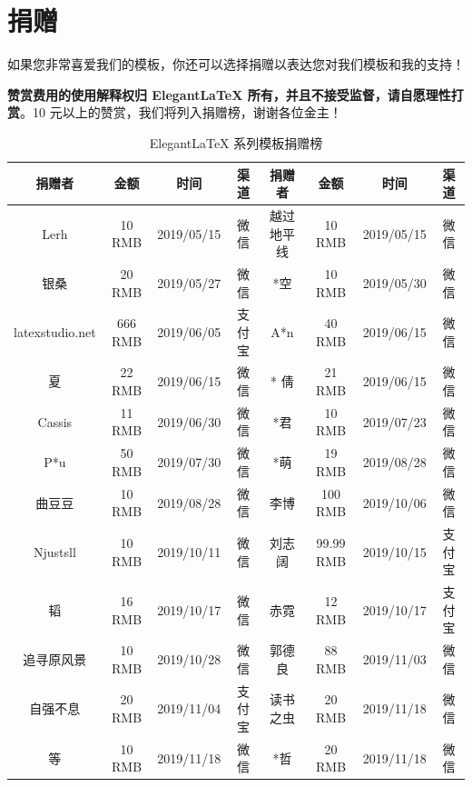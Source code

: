 \documentclass[lang=cn,11pt,a4paper,cite=authoryear]{elegantpaper}
\begin{document}
\section{捐赠}
如果您非常喜爱我们的模板，你还可以选择捐赠以表达您对我们模板和我的支持！

\begin{figure}[htbp]
  \centering

\end{figure}

\textbf{赞赏费用的使用解释权归 Elegant\LaTeX{} 所有，并且不接受监督，请自愿理性打赏}。10 元以上的赞赏，我们将列入捐赠榜，谢谢各位金主！


\begin{table}[!htb]
  \centering
  \caption{Elegant\LaTeX{} 系列模板捐赠榜}
    \begin{tabular}{*{4}{>{\scriptsize}c}|*{4}{>{\scriptsize}c}}
    \hline
    \textbf{捐赠者} & \textbf{金额} & \textbf{时间} & \textbf{渠道} & \textbf{捐赠者} & \textbf{金额} & \textbf{时间} & \textbf{渠道} \\
    \hline
    Lerh  & 10 RMB & 2019/05/15 & 微信    & 越过地平线 & 10 RMB & 2019/05/15 & 微信 \\
    银桑    & 20 RMB & 2019/05/27 & 微信    & *空    & 10 RMB & 2019/05/30 & 微信 \\
    latexstudio.net & 666 RMB & 2019/06/05 & 支付宝   & A*n   & 40 RMB & 2019/06/15 & 微信 \\
    * 夏   & 22 RMB & 2019/06/15 & 微信    & * 倩   & 21 RMB  & 2019/06/15 & 微信 \\
    Cassis & 11 RMB & 2019/06/30 & 微信    & *君    & 10 RMB & 2019/07/23 & 微信 \\
    P*u   & 50 RMB & 2019/07/30 & 微信    & *萌    & 19 RMB & 2019/08/28 & 微信 \\
    曲豆豆   & 10 RMB & 2019/08/28 & 微信    & 李博    & 100 RMB & 2019/10/06 & 微信 \\
    Njustsll & 10 RMB & 2019/10/11 & 微信    & 刘志阔   & 99.99 RMB & 2019/10/15 & 支付宝 \\
    * 韬   & 16 RMB & 2019/10/17 & 微信    & 赤霓    & 12 RMB & 2019/10/17 & 支付宝 \\
    追寻原风景 & 10 RMB & 2019/10/28 & 微信    & 郭德良   & 88 RMB & 2019/11/03 & 微信 \\
    自强不息  & 20 RMB & 2019/11/04 & 支付宝   & 读书之虫  & 20 RMB & 2019/11/18 & 微信 \\
    *等    & 10 RMB & 2019/11/18 & 微信    & *哲    & 20 RMB & 2019/11/18 & 微信 \\

\end{tabular}
\end{table}
\end{document}
